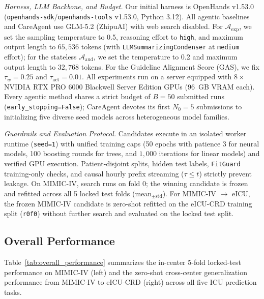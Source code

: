 \textit{Harness, LLM Backbone, and Budget.}
Our initial harness is OpenHands v1.53.0 (\texttt{openhands-sdk}/\texttt{openhands-tools} v1.53.0, Python 3.12). All agentic baselines and CareAgent use GLM-5.2 (ZhipuAI) with web search disabled. For $\mathcal{A}_{\text{exp}}$, we set the sampling temperature to 0.5, reasoning effort to \texttt{high}, and maximum output length to $65{,}536$ tokens (with \texttt{LLMSummarizingCondenser} at \texttt{medium} effort); for the stateless $\mathcal{A}_{\text{aud}}$, we set the temperature to 0.2 and maximum output length to $32{,}768$ tokens. For the Guideline Alignment Score ($\text{GAS}$), we fix $\tau_w=0.25$ and $\tau_{\text{act}}=0.01$. All experiments run on a server equipped with $8\times$ NVIDIA RTX PRO 6000 Blackwell Server Edition GPUs (96~GB VRAM each). Every agentic method shares a strict budget of $B=50$ submitted runs (\texttt{early\_stopping=False}); CareAgent devotes its first $N_0=5$ submissions to initializing five diverse seed models across heterogeneous model families.

\textit{Guardrails and Evaluation Protocol.}
Candidates execute in an isolated worker runtime (\texttt{seed=1}) with unified training caps (50 epochs with patience 3 for neural models, 100 boosting rounds for trees, and $1{,}000$ iterations for linear models) and verified GPU execution. Patient-disjoint splits, hidden test labels, \texttt{FitGuard} training-only checks, and causal hourly prefix streaming ($\tau \le t$) strictly prevent leakage. On MIMIC-IV, search runs on fold 0; the winning candidate is frozen and refitted across all 5 locked test folds (mean$_{\pm\text{std}}$). For MIMIC-IV $\rightarrow$ eICU, the frozen MIMIC-IV candidate is zero-shot refitted on the eICU-CRD training split (\texttt{r0f0}) without further search and evaluated on the locked test split.

\subsection{Overall Performance}
\label{sec:overall_performance}

Table~\ref{tab:overall_performance} summarizes the in-center 5-fold locked-test performance on MIMIC-IV (left) and the zero-shot cross-center generalization performance from MIMIC-IV to eICU-CRD (right) across all five ICU prediction tasks.

